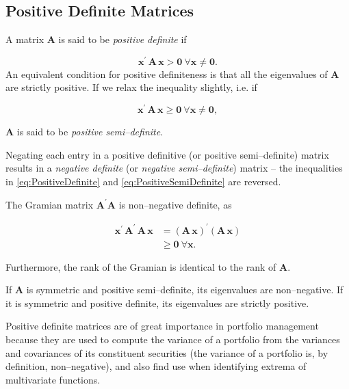 \documentclass[graybox,envcountchap,sectrefs]{svmono}\usepackage[]{graphicx}\usepackage[]{xcolor}
\begin{document}
\begin{appendices}
\subsection{Positive Definite Matrices}

A matrix $\mathbf{A}$ is said to be \emph{positive definite} if 

\begin{equation}
\mathrm{\mathbf{x}}^{\prime}\,\mathrm{\mathbf{A\,x}}>\mathrm{\mathbf{0}}\ \forall\mathrm{\mathbf{x}}\ne\mathrm{\mathbf{0}}.\label{eq:PositiveDefinite}
\end{equation}
An equivalent condition for positive definiteness is that all the
eigenvalues of $\mathbf{A}$ are strictly positive. If we relax the
inequality slightly, i.e. if

\begin{equation}
\mathrm{\mathbf{x}}^{\prime}\,\mathrm{\mathbf{A\,x}}\geqslant\mathrm{\mathbf{0}}\ \forall\mathrm{\mathbf{x}}\ne\mathrm{\mathbf{0}},\label{eq:PositiveSemiDefinite}
\end{equation}

$\mathbf{A}$ is said to be \emph{positive semi--definite}. 

Negating each entry in a positive definitive (or positive semi--definite)
matrix results in a \emph{negative definite} (or \emph{negative semi--definite})
matrix -- the inequalities in \eqref{eq:PositiveDefinite} and \eqref{eq:PositiveSemiDefinite}
are reversed.

The Gramian matrix $\mathbf{A}^{\prime}\mathrm{\mathbf{A}}$ is non--negative
definite, as

\begin{align}
\mathrm{\mathbf{x}}^{\prime}\,\mathrm{\mathbf{\mathbf{A}^{\prime}\,\mathrm{\mathbf{A}\,}x}} & =\left(\mathbf{\mathbf{A\,}x}\right)^{\prime}\left(\mathbf{\mathbf{A\,}x}\right)\nonumber \\
 & \geqslant\mathrm{\mathbf{0}\ \forall\mathrm{\mathbf{x}}}.\label{eq:GramianNonNegativeDefinite}
\end{align}

Furthermore, the rank of the Gramian is identical to the rank of $\mathbf{\mathbf{A}}$.

If $\mathbf{A}$ is symmetric and positive semi--definite, its eigenvalues
are non--negative. If it is symmetric and positive definite, its
eigenvalues are strictly positive.

Positive definite matrices are of great importance in portfolio management
because they are used to compute the variance of a portfolio from
the variances and covariances of its constituent securities (the variance
of a portfolio is, by definition, non--negative), and also find use
when identifying extrema of multivariate functions. 


\end{appendices}
\end{document}
